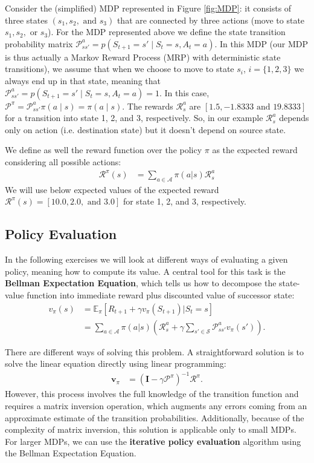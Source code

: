 Consider the (simplified) MDP represented in Figure \ref{fig:MDP}: it consists of three states $(s_1, s_2,\text{ and }s_3)$ that are connected by three actions (move to state $s_1, s_2,\text{ or }s_3$). 
For the MDP represented above we define the state transition probability matrix $\mathcal{P}^a_{ss'}=p(S_{t+1}=s'\mid S_{t}=s, A_t=a)$. In this MDP (our MDP is thus actually a Markov Reward Process (MRP) with deterministic state transitions), we assume that when we choose to move to state $s_i$, $i=\{1,2,3\}$ we always end up in that state, meaning that $\mathcal{P}^a_{ss'}=p(S_{t+1}=s'\mid S_{t}=s, A_t=a)=1$. In this case, $\mathcal{P}^{\pi}=\mathcal{P}^a_{ss'}\pi(a\mid s) = \pi(a\mid s)$. 
The rewards $\mathcal{R}_s^a$ are $[1.5, -1.8333 \text{ and } 19.8333]$ for a transition into state 1, 2, and 3, respectively. So, in our example $\mathcal{R}_s^a$ depends only on action (i.e. destination state) but it doesn't depend on source state.

We define as well the reward function over the policy $\pi$ as the expected reward considering all possible actions:
\begin{align*}
    {\mathcal{R}}^{\pi}(s) & = \sum_{a \in \mathcal{A}} \pi(a|s) \mathcal{R}_s^a
\end{align*}
We will use below expected values of the expected reward ${\mathcal{R}}^{\pi}(s)=[ 10.0, 2.0, \text{ and } 3.0 ] $ for state 1, 2, and 3, respectively.

\subsection{Policy Evaluation}
In the following exercises we will look at different ways of evaluating a given policy, meaning how to compute its value. 
 A central tool for this task is the \textbf{Bellman Expectation Equation}, which tells us how to decompose the state-value function into immediate reward plus discounted value of successor state:
\begin{align*}
    v_{\pi}(s) & = \mathbb{E}_{\pi}[R_{t+1} + \gamma v_{\pi}(S_{t+1}) | S_t = s]\\
    & = \sum_{a \in \mathcal{A}} \pi(a|s) \left( \mathcal{R}_s^a + \gamma \sum_{s' \in \mathcal{S}} \mathcal{P}_{ss'}^a v_{\pi}(s') \right).
\end{align*}

There are different ways of solving this problem. A straightforward solution is to solve the linear equation directly using linear programming:
\begin{align*}
    \boldsymbol{v}_{\pi} & = (\boldsymbol{I} -  \gamma \boldsymbol{\mathcal{P}}^{\pi})^{-1} \boldsymbol{\mathcal{R}}^{\pi}.
\end{align*}
However, this process involves the full knowledge of the transition function and requires a matrix inversion operation, which augments any errors coming from an approximate estimate of the transition probabilities.
Additionally, because of the complexity of matrix inversion, this solution is applicable only to small MDPs. For larger MDPs, we can use the \textbf{iterative policy evaluation} algorithm using the Bellman Expectation Equation.

